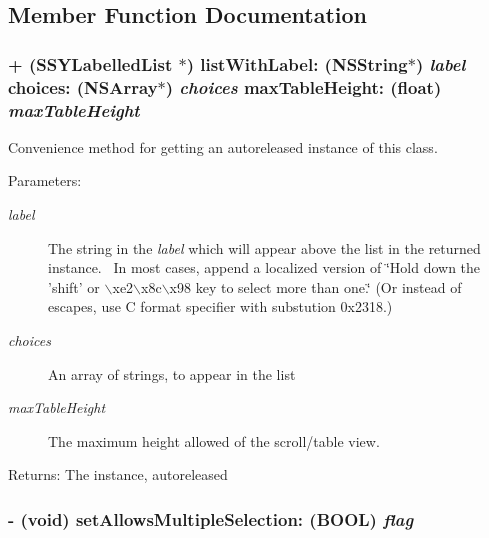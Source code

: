 \subsection{Member Function Documentation}
\hypertarget{interface_s_s_y_labelled_list_2a5643a553c82edcf83ec234f21923e7}{
\subsubsection[{listWithLabel:choices:maxTableHeight:}]{\setlength{\rightskip}{0pt plus 5cm}+ ({\bf SSYLabelledList} $\ast$) listWithLabel: (NSString$\ast$) {\em label}\/ choices: (NSArray$\ast$) {\em choices}\/ maxTableHeight: (float) {\em maxTableHeight}}}
\label{interface_s_s_y_labelled_list_2a5643a553c82edcf83ec234f21923e7}


Convenience method for getting an autoreleased instance of this class. 

\begin{Desc}
\item[Parameters:]
\begin{description}
\item[{\em label}]The string in the {\em label\/} which will appear above the list in the returned instance.~ In most cases, append a localized version of \char`\"{}Hold down the 'shift' or $\backslash$xe2$\backslash$x8c$\backslash$x98 key to select more than one.\char`\"{} (Or instead of  escapes, use C format specifier with substution 0x2318.) \item[{\em choices}]An array of strings, to appear in the list \item[{\em maxTableHeight}]The maximum height allowed of the scroll/table view. \end{description}
\end{Desc}
\begin{Desc}
\item[Returns:]The instance, autoreleased \end{Desc}
\hypertarget{interface_s_s_y_labelled_list_db8c7701fa1bab293368423691e60a61}{
\subsubsection[{setAllowsMultipleSelection:}]{\setlength{\rightskip}{0pt plus 5cm}- (void) setAllowsMultipleSelection: (BOOL) {\em flag}}}
\label{interface_s_s_y_labelled_list_db8c7701fa1bab293368423691e60a61}


